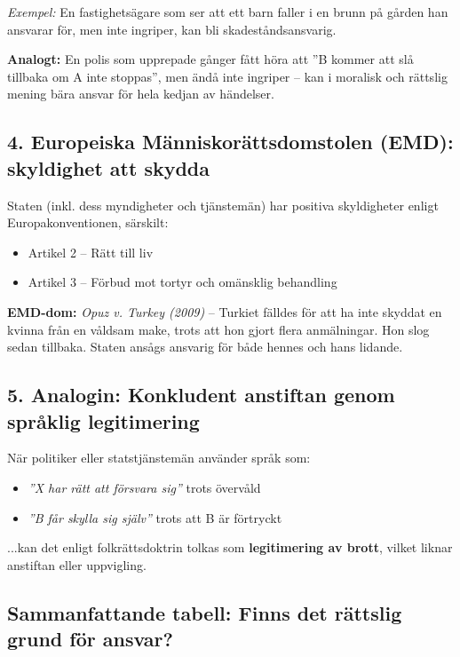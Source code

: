 \textit{Exempel:} En fastighetsägare som ser att ett barn faller i en brunn på gården han ansvarar för, men inte ingriper, kan bli skadeståndsansvarig.

\textbf{Analogt:} En polis som upprepade gånger fått höra att ”B kommer att slå tillbaka om A inte stoppas”, men ändå inte ingriper – kan i moralisk och rättslig mening bära ansvar för hela kedjan av händelser.

\subsection*{4. Europeiska Människorättsdomstolen (EMD): skyldighet att skydda}

Staten (inkl. dess myndigheter och tjänstemän) har positiva skyldigheter enligt Europakonventionen, särskilt:

\begin{itemize}
  \item Artikel 2 – Rätt till liv
  \item Artikel 3 – Förbud mot tortyr och omänsklig behandling
\end{itemize}

\textbf{EMD-dom:} \textit{Opuz v. Turkey (2009)} – Turkiet fälldes för att ha inte skyddat en kvinna från en våldsam make, trots att hon gjort flera anmälningar.  
Hon slog sedan tillbaka. Staten ansågs ansvarig för både hennes och hans lidande.

\subsection*{5. Analogin: Konkludent anstiftan genom språklig legitimering}

När politiker eller statstjänstemän använder språk som:

\begin{itemize}
  \item \textit{”X har rätt att försvara sig”} trots övervåld
  \item \textit{”B får skylla sig själv”} trots att B är förtryckt
\end{itemize}

...kan det enligt folkrättsdoktrin tolkas som \textbf{legitimering av brott}, vilket liknar anstiftan eller uppvigling.

\subsection*{Sammanfattande tabell: Finns det rättslig grund för ansvar?}

